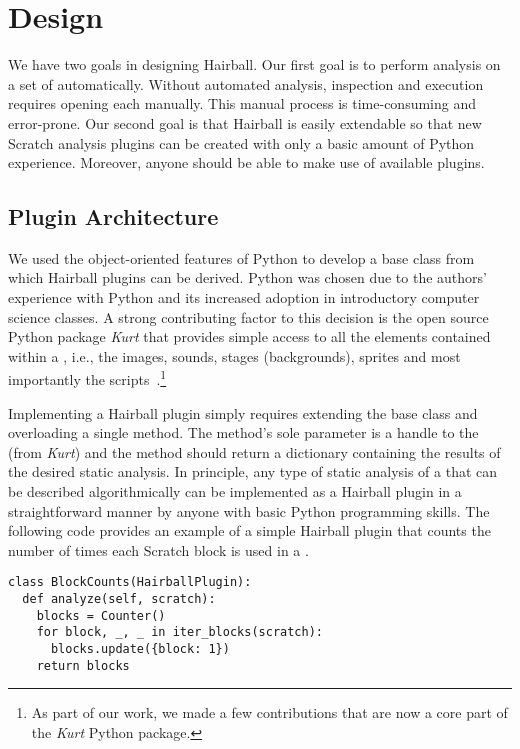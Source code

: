 \section{Design}

We have two goals in designing Hairball. Our first goal is to perform analysis
on a set of  automatically. Without automated analysis, inspection
and execution requires opening each \sprogram{} manually. This manual process
is time-consuming and error-prone.  Our second goal is that Hairball is easily
extendable so that new Scratch analysis plugins can be created with only a
basic amount of Python experience. Moreover, anyone should be able to make use
of available plugins.


\subsection{Plugin Architecture}
We used the object-oriented features of Python to develop a base class from
which Hairball plugins can be derived. Python was chosen due to the authors'
experience with Python and its increased adoption in introductory computer
science classes. A strong contributing factor to this decision is the open
source Python package \emph{Kurt} that provides simple access to all the
elements contained within a \sprogram{}, i.e., the images, sounds, stages
(backgrounds), sprites and most importantly the
scripts~\cite{Radvan:2012:Online}.\footnote{As part of our work, we made a few
  contributions that are now a core part of the \emph{Kurt} Python package.}

Implementing a Hairball plugin simply requires extending the base class and
overloading a single method. The method's sole parameter is a handle to the
\sprogram{} (from \emph{Kurt}) and the method should return a dictionary
containing the results of the desired static analysis. In principle, any type
of static analysis of a \sprogram{} that can be described algorithmically can
be implemented as a Hairball plugin in a straightforward manner by anyone with
basic Python programming skills. The following code provides an example of a
simple Hairball plugin that counts the number of times each Scratch block is
used in a \sprogram{}.

\begin{verbatim}
class BlockCounts(HairballPlugin):
  def analyze(self, scratch):
    blocks = Counter()
    for block, _, _ in iter_blocks(scratch):
      blocks.update({block: 1})
    return blocks
\end{verbatim}
